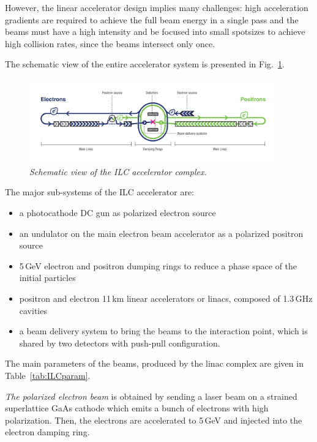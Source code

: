 However, the linear accelerator design implies many challenges: high acceleration gradients are required to achieve the full beam energy in a single pass and the beams must have a high intensity and be focused into small spotsizes to achieve high collision rates, since the beams intersect only once.

The schematic view of the entire accelerator system is presented in Fig.~\ref{fig:ILCScheme}. 
\begin{figure}
{\centering
    \includegraphics[width=0.95\textwidth]{graphics/ILC_scheme.jpg}
    \caption{\sl Schematic view of the ILC accelerator complex.}
    \label{fig:ILCScheme}
  }
\end{figure}
The major sub-systems of the ILC accelerator are:
\begin{itemize}
\item a photocathode DC gun as polarized electron source
\item an undulator on the main electron beam accelerator as a polarized positron source
\item 5\,GeV electron and positron dumping rings to reduce a phase space of the initial particles
\item positron and electron 11\,km linear accelerators or linacs, composed of 1.3\,GHz cavities
\item a beam delivery system to bring the beams to the interaction point, which is shared by two detectors with push-pull configuration.
\end{itemize}
The main parameters of the beams, produced by the linac complex are given in Table~\ref{tab:ILCparam}.

\textit{The polarized electron beam} is obtained by sending a laser beam on a strained superlattice GaAs cathode which emits a bunch of electrons with high polarization. Then, the electrons are accelerated to 5\,GeV and injected into the electron damping ring.

